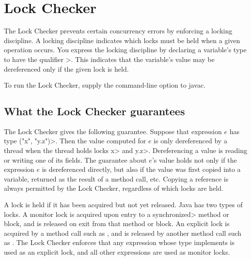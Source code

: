 \htmlhr
\chapter{Lock Checker\label{lock-checker}}

The Lock Checker prevents certain concurrency errors by enforcing a
locking discipline.  A locking discipline indicates which locks must be held
when a given operation occurs.  You express the locking discipline by
declaring a variable's type to have the qualifier
\<>.
This indicates that the variable's value may
be dereferenced only if the given lock is held.


To run the Lock Checker, supply the
command-line option to javac.


\section{What the Lock Checker guarantees\label{lock-guarantees}}

The Lock Checker gives the following guarantee.
Suppose that expression $e$ has type
\<(\ttlcb"x", "y.z"\ttrcb)>.
Then the value computed for $e$ is only dereferenced by a thread when the
thread holds locks \<x> and \<y.z>.
Dereferencing a value is reading or writing one of its fields.
The guarantee about $e$'s value
holds not only if the expression $e$ is dereferenced
directly, but also if the value was first copied into a variable,
returned as the
result of a method call, etc.
Copying a reference is always
permitted by the Lock Checker, regardless of which locks are held.

A lock is held if it has been acquired but not yet released.
Java has two types of locks.
A monitor lock is acquired upon entry to a \<synchronized> method or block,
and is released on exit from that method or block.
An explicit lock is acquired by a method call such as
,
and is released by another method call such as
.
The Lock Checker enforces that any expression whose type implements
 is used as an
explicit lock, and all other expressions are used as monitor locks.

